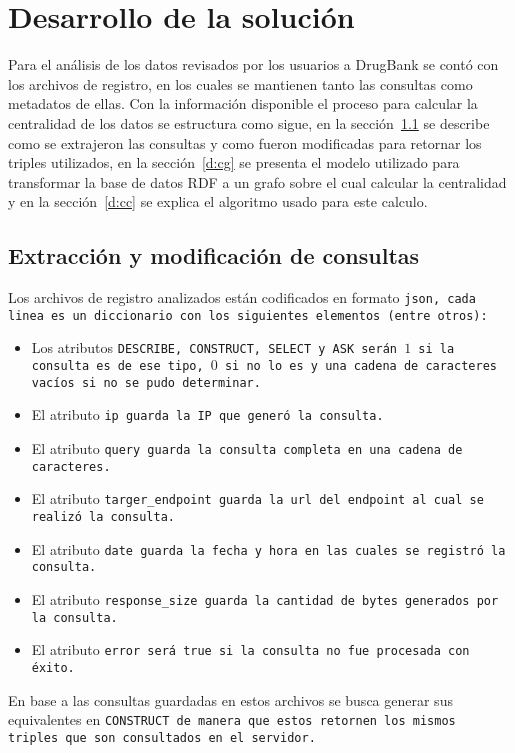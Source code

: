 
\chapter{Desarrollo de la solución}

Para el análisis de los datos revisados por los usuarios a DrugBank se contó con
los archivos de registro, en los cuales se mantienen tanto las consultas como
metadatos de ellas. Con la información disponible el proceso para calcular la
centralidad de los datos se estructura como sigue, en la sección~\ref{d:emc}
se describe como se extrajeron las consultas y como fueron modificadas para
retornar los triples utilizados, en la sección~\ref{d:cg} se presenta el modelo
utilizado para transformar la base de datos RDF a un grafo sobre el cual
calcular la centralidad y en la sección~\ref{d:cc} se explica el algoritmo
usado para este calculo.

\section{Extracción y modificación de consultas}\label{d:emc}
Los archivos de registro analizados están codificados en formato \tt{json},
cada linea es un diccionario con los siguientes elementos (entre otros):
\begin{itemize}
  \item
    Los atributos \tt{DESCRIBE}, \tt{CONSTRUCT}, \tt{SELECT} y \tt{ASK} serán
    $1$ si la consulta es de ese tipo, $0$ si no lo es y una cadena de
    caracteres vacíos si no se pudo determinar.
  \item
    El atributo \tt{ip} guarda la IP que generó la consulta.
  \item
    El atributo \tt{query} guarda la consulta completa en una cadena de
    caracteres. 
  \item
    El atributo \tt{targer\_endpoint} guarda la \tt{url} del \tt{endpoint} al
    cual se realizó la consulta.
  \item
    El atributo \tt{date} guarda la fecha y hora en las cuales se registró la
    consulta.
  \item
    El atributo \tt{response\_size} guarda la cantidad de bytes generados por la
    consulta.
  \item
    El atributo \tt{error} será \tt{true} si la consulta no fue procesada con
    éxito.
\end{itemize}

En base a las consultas guardadas en estos archivos se busca generar sus
equivalentes en \tt{CONSTRUCT} de manera que estos retornen los mismos triples
que son consultados en el servidor.

